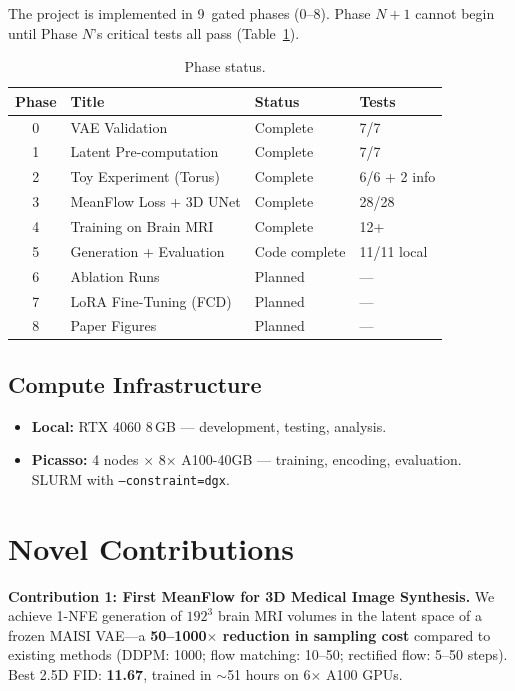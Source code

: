 \documentclass[11pt,a4paper]{article}
\newcommand{\code}[1]{\texttt{#1}}
\begin{document}
The project is implemented in 9~gated phases (0--8).  Phase $N{+}1$ cannot
begin until Phase $N$'s critical tests all pass (Table~\ref{tab:phases}).

\begin{table}[ht]
\centering
\caption{Phase status.}
\label{tab:phases}
\begin{tabular}{clll}
\toprule
\textbf{Phase} & \textbf{Title} & \textbf{Status} & \textbf{Tests} \\
\midrule
0 & VAE Validation         & Complete      & 7/7 \\
1 & Latent Pre-computation & Complete      & 7/7 \\
2 & Toy Experiment (Torus) & Complete      & 6/6 + 2 info \\
3 & MeanFlow Loss + 3D UNet & Complete    & 28/28 \\
4 & Training on Brain MRI  & Complete      & 12+ \\
5 & Generation + Evaluation & Code complete & 11/11 local \\
6 & Ablation Runs          & Planned       & --- \\
7 & LoRA Fine-Tuning (FCD) & Planned       & --- \\
8 & Paper Figures          & Planned       & --- \\
\bottomrule
\end{tabular}
\end{table}

\subsection{Compute Infrastructure}

\begin{itemize}[nosep]
  \item \textbf{Local:} RTX 4060 8\,GB --- development, testing, analysis.
  \item \textbf{Picasso:} 4 nodes $\times$ 8$\times$ A100-40GB --- training,
        encoding, evaluation.  SLURM with \code{--constraint=dgx}.
\end{itemize}


\section{Novel Contributions}
\label{sec:contributions}

\textbf{Contribution 1: First MeanFlow for 3D Medical Image Synthesis.}
We achieve 1-NFE generation of $192^3$ brain MRI volumes in the latent space
of a frozen MAISI VAE---a \textbf{50--1000$\times$ reduction in sampling cost}
compared to existing methods (DDPM: 1000; flow matching: 10--50; rectified
flow: 5--50 steps).  Best 2.5D FID: \textbf{11.67}, trained in ${\sim}$51
hours on 6$\times$ A100 GPUs.
\end{document}
